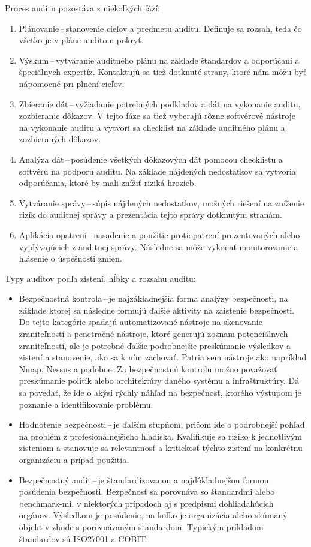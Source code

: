 \vspace{1em}
\noindent
Proces auditu pozostáva z niekoľkých fází: \cite{Jackson2010} 
\begin{enumerate}
	\item Plánovanie\,--\,stanovenie cieľov a predmetu auditu. Definuje sa rozsah, teda čo všetko je v pláne auditom pokryť. 
	\item Výskum\,--\,vytváranie auditného plánu na základe štandardov a odporúčaní a špeciálnych expertíz. Kontaktujú sa tiež dotknuté strany, ktoré nám môžu byť nápomocné pri plnení cieľov.
	\item Zbieranie dát\,--\,vyžiadanie potrebných podkladov a dát na vykonanie auditu, zozbieranie dôkazov. V tejto fáze sa tiež vyberajú rôzne softvérové nástroje na vykonanie auditu a vytvorí sa checklist na základe auditného plánu a zozbieraných dôkazov.  
	\item Analýza dát\,--\,posúdenie všetkých dôkazových dát pomocou checklistu a softvéru na podporu auditu. Na základe nájdených nedostatkov sa vytvoria odporúčania, ktoré by mali znížiť riziká hrozieb.
	\item Vytváranie správy\,--\,súpis nájdených nedostatkov, možných riešení na zníženie rizík do auditnej správy a prezentácia tejto správy dotknutým stranám.
	\item Aplikácia opatrení\,--\,nasadenie a použitie protiopatrení prezentovaných alebo vyplývajúcich z auditnej správy. Následne sa môže vykonať monitorovanie a hlásenie o úspešnosti zmien.
\end{enumerate}

\vspace{1em}
\noindent
Typy auditov podľa zistení, hĺbky a rozsahu auditu:
\begin{itemize}
	\item Bezpečnostná kontrola\,--\,je najzákladnejšia forma analýzy bezpečnosti, na základe ktorej sa následne formujú ďalšie aktivity na zaistenie bezpečnosti. Do tejto kategórie spadajú automatizované nástroje na skenovanie zraniteľností a penetračné nástroje, ktoré generujú zoznam potenciálnych zraniteľností, ale je potrebné ďalšie podrobnejšie preskúmanie výsledkov a zistení a stanovenie, ako sa k ním zachovať. Patria sem nástroje ako napríklad Nmap, Nessus a podobne. Za bezpečnostnú kontrolu možno považovať preskúmanie politík alebo architektúry daného systému a infraštruktúry. Dá sa povedať, že ide o akýsi rýchly náhľad na bezpečnosť, ktorého výstupom je poznanie a identifikovanie problému.
	\item Hodnotenie bezpečnosti\,--\,je ďalším stupňom, pričom ide o podrobnejší pohľad na problém z profesionálnejšieho hľadiska. Kvalifikuje sa riziko k jednotlivým zisteniam a stanovuje sa relevantnosť a kritickosť týchto zistení na konkrétnu organizáciu a prípad použitia.
	\item Bezpečnostný audit\,--\,je štandardizovanou a najdôkladnejšou formou posúdenia bezpečnosti. Bezpečnosť sa porovnáva so štandardmi alebo benchmark-mi, v niektorých prípadoch aj s predpismi dohliadahúcich orgánov. Výsledkom je posúdenie, na koľko je organizácia alebo skúmaný objekt v zhode s porovnávaným štandardom. Typickým príkladom štandardov sú ISO27001 a COBIT.
\end{itemize}

